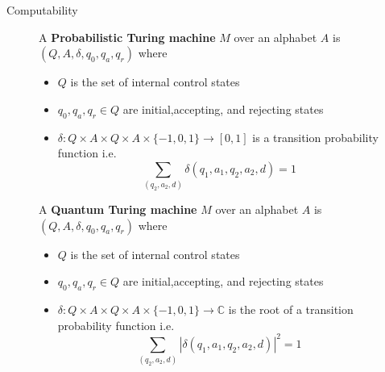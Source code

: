 \documentclass{beamer}
\begin{document}
\begin{frame}{Computability}

\begin{figure}[ht]
{\small
    \begin{minipage}{0.4\textwidth}
       A \textbf{Probabilistic Turing machine} $M$ over an alphabet $A$ is $\left(Q,A,\delta,q_0,q_a,q_r\right)$ where
       \begin{itemize}
         \item $Q$ is the set of internal control states
         \item $q_0,q_a,q_r\in Q$ are initial,accepting, and rejecting states
         \item $\delta:Q\times A\times Q\times A\times\{-1,0,1\}\to [0,1]$ is a transition probability function i.e.
           \[
             \sum_{\left(q_2,a_2,d\right)}\delta\left(q_1,a_1,q_2,a_2,d\right)=1
           \]
       \end{itemize}
    \end{minipage}
    \qquad
    \begin{minipage}{0.4\textwidth}
       A \textbf{Quantum Turing machine} $M$ over an alphabet $A$ is $\left(Q,A,\delta,q_0,q_a,q_r\right)$ where
       \begin{itemize}
         \item $Q$ is the set of internal control states
         \item $q_0,q_a,q_r\in Q$ are initial,accepting, and rejecting states
         \item $\delta:Q\times A\times Q\times A\times\{-1,0,1\}\to \mathbb{C}$ is the root of a transition probability function i.e.
           \[
             \sum_{\left(q_2,a_2,d\right)}|\delta\left(q_1,a_1,q_2,a_2,d\right)|^2=1
           \]
       \end{itemize}
    \end{minipage}
}
\end{figure}

\end{frame}
\end{document}
